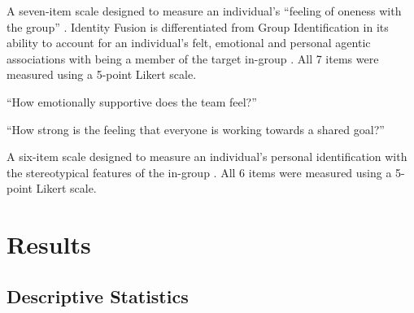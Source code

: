 \item [Identity Fusion Verbal] A seven-item scale designed to measure an individual's ``feeling of oneness with the group'' \citep{Swann2009}.  Identity Fusion is differentiated from Group Identification in its ability to account for an individual's felt, emotional and personal agentic associations with being a member of the target in-group \citep{Swann2012a}.  All 7 items were measured using a 5-point Likert scale.


\item [Emotional Support] ``How emotionally supportive does the team feel?''
\item [Shared Goal] ``How strong is the feeling that everyone is working towards a shared goal?''

\item [Group Identification Verbal] A six-item scale designed to measure an individual's personal identification with the stereotypical features of the in-group  \citep{Mael1992}.  All 6 items were measured using a 5-point Likert scale.








\section{\label{app6:results}Results}

\subsection{Descriptive Statistics\label{app6:descriptives}}














